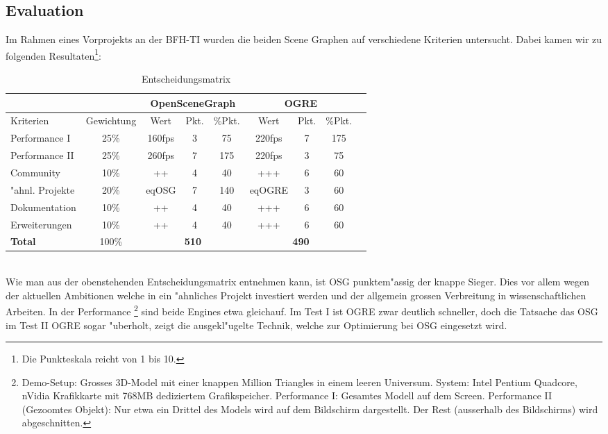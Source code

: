 \subsection{Evaluation }
Im Rahmen eines Vorprojekts an der BFH-TI wurden die beiden Scene Graphen auf verschiedene Kriterien untersucht. Dabei kamen wir zu folgenden Resultaten\footnote{Die Punkteskala reicht von 1 bis 10.}:
	\begin{table}[ht]
	\centering
		\begin{tabular}{|l|c||c|c|c||c|c|c|c|}
			\multicolumn{2}{r}{} 	& \multicolumn{3}{c}{\textbf{OpenSceneGraph}} & \multicolumn{3}{c}{\textbf{OGRE}} \\
			\hline
			Kriterien	& Gewichtung		& Wert 	& Pkt. & \%Pkt. 	& Wert 	& Pkt. 	& \%Pkt.\\
			\hline
			Performance I 	&	25\%		& 160fps 		&  3 	 	& 75 		& 220fps 	&	7 		&		175	\\
			Performance II	&	25\% 		& 260fps 		&  7		& 175		& 220fps	& 3			& 	75	\\
			Community 			&	10\%		&	++	 			&  4	 	& 40		& +++			&	6   	& 	60	\\
			"ahnl. Projekte &	20\%		&	eqOSG			&  7		& 140		& eqOGRE	&	3			&		60  \\
			Dokumentation 	&	10\%		&	++				&  4		& 40   	& +++		 	& 6			&		60 	\\
			Erweiterungen		&	10\%		&	++				& 4		 	& 40    & +++		 	& 6			&		60	\\
			\hline
			\hline
			\textbf{Total} & 100\% & \multicolumn{3}{c||}{\textbf{510}}& \multicolumn{3}{c|}{\textbf{490}}\\
			\hline
			\end{tabular}
		\caption{Entscheidungsmatrix}
		\label{tab:Entscheidungsmatrix}
	\end{table}
\\
Wie man aus der obenstehenden Entscheidungsmatrix entnehmen kann, ist OSG punktem"assig der knappe Sieger. Dies vor allem wegen der aktuellen Ambitionen welche in ein "ahnliches Projekt investiert werden und der allgemein grossen Verbreitung in wissenschaftlichen Arbeiten. In der Performance
\footnote{Demo-Setup: Grosses 3D-Model mit einer knappen Million Triangles in einem leeren Universum. System: Intel Pentium Quadcore, nVidia Krafikkarte mit 768MB dediziertem Grafikspeicher. Performance I: Gesamtes Modell auf dem Screen. Performance II (Gezoomtes Objekt): Nur etwa ein Drittel des Models wird auf dem Bildschirm dargestellt. Der Rest (ausserhalb des Bildschirms) wird abgeschnitten.} 
sind beide Engines etwa gleichauf. Im Test I ist OGRE zwar deutlich schneller, doch die Tatsache das OSG im Test II OGRE sogar "uberholt, zeigt die ausgekl"ugelte Technik, welche zur Optimierung bei OSG eingesetzt wird. \\
